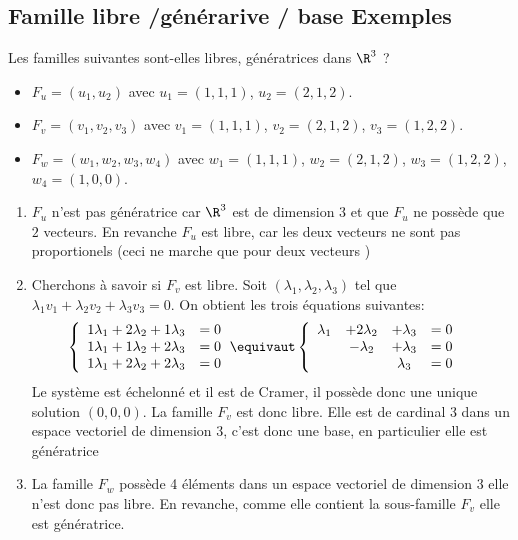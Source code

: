 \subsection{Famille libre /générarive / base Exemples}

\begin{exercice}
Les familles suivantes sont-elles libres, génératrices dans $\R^3$ ?
\begin{itemize}
\item $F_u=(u_1,u_2) $ avec $u_1 = (1,1,1) $, $u_2=(2,1,2)$.
\item $F_v=(v_1,v_2, v_3) $ avec $v_1 = (1,1,1) $, $v_2=(2,1,2)$, $v_3=(1,2,2)$. 
\item $F_w=(w_1,w_2, w_3,w_4) $ avec $w_1 = (1,1,1) $, $w_2=(2,1,2)$, $w_3=(1,2,2)$, $w_4=(1,0,0)$. 
\end{itemize}
\end{exercice}
\vsec\vsec\vsec
\begin{correction}
\begin{enumerate}
\item $F_u$ n'est pas génératrice car $\R^3$ est de dimension $3$ et que $F_u$ ne possède que $2$ vecteurs. En revanche $F_u$ est libre, car les deux vecteurs ne sont pas proportionels (ceci ne marche que pour deux vecteurs )
\item Cherchons à savoir si $F_v$ est libre. 
Soit $(\lambda_1, \lambda_2, \lambda_3) $ tel que $\lambda_1 v_1 +\lambda_2 v_2 +\lambda_3 v_3 =0$. 
On obtient les trois équations suivantes:
\begin{align*}
\left\{ 
\begin{array}{cc}
1\lambda_1 +2\lambda_2 +1\lambda_3 &=0\\
1\lambda_1 +1\lambda_2 +2\lambda_3 &=0\\
1\lambda_1 +2\lambda_2 +2\lambda_3 &=0
\end{array}\right. & \equivaut 
\left\{ 
\begin{array}{cccc}
\lambda_1 &+2\lambda_2 &+\lambda_3 &=0\\
 &-\lambda_2 &+\lambda_3 &=0\\
&&\lambda_3 &=0
\end{array}\right. 
\end{align*}
Le système est échelonné et il est de Cramer, il possède donc une unique solution $(0,0,0)$. La famille $F_v$ est donc libre. 
Elle est de cardinal 3 dans un espace vectoriel de dimension 3, c'est donc une base, en particulier elle est génératrice 
\item La famille $F_w$ possède 4 éléments dans un espace vectoriel de dimension $3$ elle n'est donc pas libre. En revanche, comme elle contient la sous-famille $F_v$ elle est génératrice. 

\end{enumerate}
\end{correction}